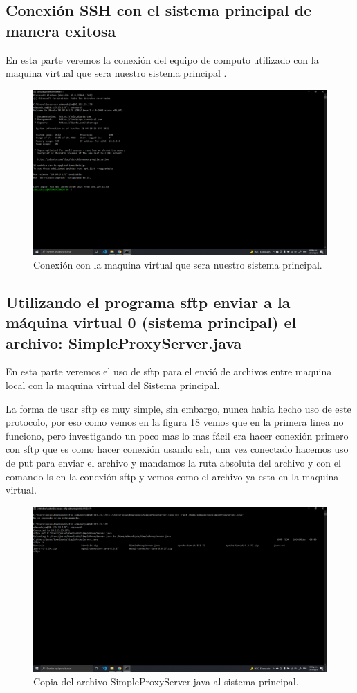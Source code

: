 \documentclass[11pt]{article}
\begin{document}
		\subsection{Conexión SSH con el sistema principal de manera exitosa}
		En esta parte veremos la conexión del equipo de computo utilizado con la maquina virtual que sera nuestro sistema principal	.
		\begin{figure}[H]
			\centering
			\includegraphics[scale=0.34]{resources/p4.png}
			\caption{Conexión con la maquina virtual que sera nuestro sistema principal.}\label{fig:picture}
		\end{figure}
		\subsection{Utilizando el programa sftp enviar a la máquina virtual 0 (sistema principal) el archivo: SimpleProxyServer.java}
		En esta parte veremos el uso de sftp para el envió de archivos entre maquina local con la maquina virtual del Sistema principal.\par
		La forma de usar sftp es muy simple, sin embargo, nunca había hecho uso de este protocolo, por eso como vemos en la figura 18 vemos que en la primera linea no funciono, pero investigando un poco mas lo mas fácil era hacer conexión primero con sftp que es como hacer conexión usando ssh, una vez conectado hacemos uso de put para enviar el archivo y mandamos la ruta absoluta del archivo y con el comando ls en la conexión sftp y vemos como el archivo ya esta en la maquina virtual.
		\begin{figure}[H]
			\centering
			\includegraphics[scale=0.34]{resources/p5.png}
			\caption{Copia del archivo SimpleProxyServer.java al sistema principal.}\label{fig:picture}
		\end{figure}
\end{document}
